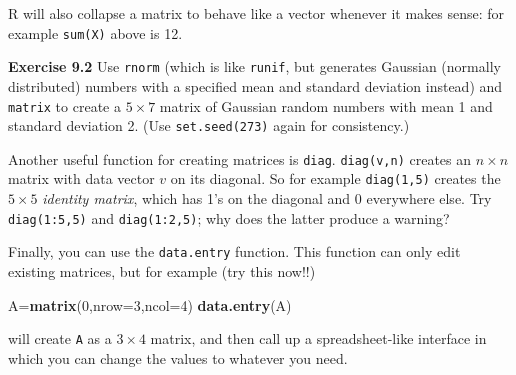 \documentclass[11pt,]{article}
\newenvironment{Shaded}{\begin{snugshade}}{\end{snugshade}}
\newcommand{\KeywordTok}[1]{\textcolor[rgb]{0.13,0.29,0.53}{\textbf{#1}}}
\newcommand{\DataTypeTok}[1]{\textcolor[rgb]{0.13,0.29,0.53}{#1}}
\newcommand{\DecValTok}[1]{\textcolor[rgb]{0.00,0.00,0.81}{#1}}
\newcommand{\NormalTok}[1]{#1}
\begin{document}
R will also collapse a matrix to behave like a vector whenever it makes
sense: for example \texttt{sum(X)} above is 12.

\textbf{Exercise 9.2} Use \texttt{rnorm} (which is like \texttt{runif},
but generates Gaussian (normally distributed) numbers with a specified
mean and standard deviation instead) and \texttt{matrix} to create a
\(5 \times 7\) matrix of Gaussian random numbers with mean 1 and
standard deviation 2. (Use \texttt{set.seed(273)} again for
consistency.)

Another useful function for creating matrices is \texttt{diag}.
\texttt{diag(v,n)} creates an \(n \times n\) matrix with data vector
\(v\) on its diagonal. So for example \texttt{diag(1,5)} creates the
\(5 \times 5\) \emph{identity matrix}, which has 1's on the diagonal and
0 everywhere else. Try \texttt{diag(1:5,5)} and \texttt{diag(1:2,5)};
why does the latter produce a warning?

Finally, you can use the \texttt{data.entry} function. This function can
only edit existing matrices, but for example (try this now!!)

\begin{Shaded}
\begin{Highlighting}[]
\NormalTok{A=}\KeywordTok{matrix}\NormalTok{(}\DecValTok{0}\NormalTok{,}\DataTypeTok{nrow=}\DecValTok{3}\NormalTok{,}\DataTypeTok{ncol=}\DecValTok{4}\NormalTok{)}
\KeywordTok{data.entry}\NormalTok{(A)}
\end{Highlighting}
\end{Shaded}

will create \texttt{A} as a \(3 \times 4\) matrix, and then call up a
spreadsheet-like interface in which you can change the values to
whatever you need.
\end{document}
